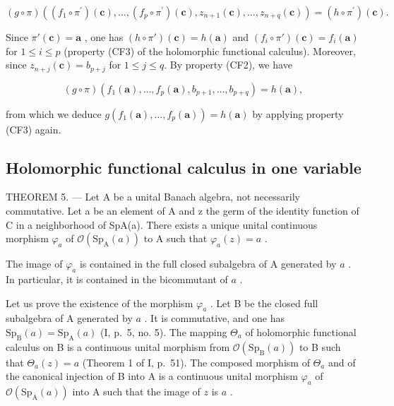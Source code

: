 \[
(g \circ \pi) \left((f _ {1} \circ \pi^ {\prime}) (\boldsymbol {c}), \dots , (f _ {p} \circ \pi^ {\prime}) (\boldsymbol {c}), z _ {n + 1} (\boldsymbol {c}), \dots , z _ {n + q} (\boldsymbol {c})\right) = (h \circ \pi^ {\prime}) (\boldsymbol {c}).
\]

Since \(\pi'(\boldsymbol{c}) = \boldsymbol{a}\) , one has \((h \circ \pi')(\boldsymbol{c}) = h(\boldsymbol{a})\) and \((f_i \circ \pi')(\boldsymbol{c}) = f_i(\boldsymbol{a})\) for \(1 \leqslant i \leqslant p\) (property (CF3) of the holomorphic functional calculus). Moreover, since \(z_{n+j}(\boldsymbol{c}) = b_{p+j}\) for \(1 \leqslant j \leqslant q\). By property (CF2), we have

\[
(g \circ \pi) (f _ {1} (\boldsymbol {a}), \dots , f _ {p} (\boldsymbol {a}), b _ {p + 1}, \dots , b _ {p + q}) = h (\boldsymbol {a}),
\]

from which we deduce \(g(f_{1}(\boldsymbol{a}), \ldots, f_{p}(\boldsymbol{a})) = h(\boldsymbol{a})\) by applying property (CF3) again.

\subsection{Holomorphic functional calculus in one variable}

THEOREM 5. --- Let A be a unital Banach algebra, not necessarily commutative. Let a be an element of A and z the germ of the identity function of C in a neighborhood of SpA(a). There exists a unique unital continuous morphism \(\varphi_{a}\) of \(\mathcal{O}(\mathrm{Sp}_{\mathrm{A}}(a))\) to A such that \(\varphi_{a}(z)=a\) .

The image of \(\varphi_{a}\) is contained in the full closed subalgebra of A generated by \(a\) . In particular, it is contained in the bicommutant of \(a\) .

Let us prove the existence of the morphism \(\varphi_{a}\) . Let B be the closed full subalgebra of A generated by \(a\) . It is commutative, and one has \(\mathrm{Sp}_{\mathrm{B}}(a) = \mathrm{Sp}_{\mathrm{A}}(a)\) (I, p.~5, no. 5). The mapping \(\Theta_{a}\) of holomorphic functional calculus on B is a continuous unital morphism from \(\mathcal{O}(\mathrm{Sp}_{\mathrm{B}}(a))\) to B such that \(\Theta_{a}(z) = a\) (Theorem 1 of I, p.~51). The composed morphism of \(\Theta_{a}\) and of the canonical injection of B into A is a continuous unital morphism \(\varphi_{a}\) of \(\mathcal{O}(\mathrm{Sp}_{\mathrm{A}}(a))\) into A such that the image of \(z\) is \(a\) .

